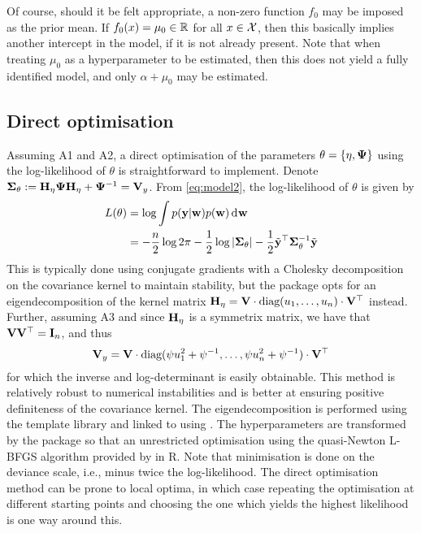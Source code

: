 Of course, should it be felt appropriate, a non-zero function $f_0$ may be imposed as the prior mean.
If $f_0(x) = \mu_0 \in \bbR$ for all $x\in\cX$, then this basically implies another intercept in the model, if it is not already present.
Note that when treating $\mu_0$ as a hyperparameter to be estimated, then this does not yield a fully identified model, and only $\alpha +\mu_0$ may be estimated.


 



\subsection{Direct optimisation}

Assuming A1 and A2, a direct optimisation of the parameters $\theta=\{\eta,\bPsi \}$ using the log-likelihood of $\theta$ is straightforward to implement.
Denote $\bSigma_\theta := \bH_\eta\bPsi\bH_\eta + \bPsi^{-1} = \bV_y$.
From \eqref{eq:model2}, the log-likelihood of $\theta$ is given by
%
\begin{align}
  L(\theta)
  &= \log \int p(\by|\bw)p(\bw) \dint \bw \nonumber \\
  &= -\half[n]\log 2\pi - \half\log\vert \bSigma_\theta \vert - \half \tilde\by^\top \bSigma_\theta^{-1} \tilde\by \label{eq:marglogliky}
\end{align}
%
This is typically done using conjugate gradients with a Cholesky decomposition on the covariance kernel to maintain stability, but the  package opts for an eigendecomposition of the kernel matrix $\bH_{\eta} = \bV\cdot\text{diag}(u_1,\dots,u_n)\cdot\bV^\top$ instead.
Further, assuming A3 and since $\bH_{\eta}$ is a symmetrix matrix, we have that $\bV\bV^\top = \bI_n$, and thus
%
\[
  \bV_y = \bV \cdot \text{diag} (\psi u_1^2 + \psi^{-1},\dots,\psi u_n^2 + \psi^{-1}) \cdot \bV^\top
\]
%
for which the inverse and log-determinant is easily obtainable.
This method is relatively robust to numerical instabilities and is better at ensuring positive definiteness of the covariance kernel.
The eigendecomposition is performed using the   template library and linked to  using  \citep{eddelbuettel2011rcpp}.
The hyperparameters are transformed by the  package so that an unrestricted optimisation using the quasi-Newton L-BFGS algorithm provided by  in \proglang R.
Note that minimisation is done on the deviance scale, i.e., minus twice the log-likelihood.
The direct optimisation method can be prone to local optima, in which case repeating the optimisation at different starting points and choosing the one which yields the highest likelihood is one way around this.

